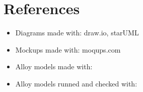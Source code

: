 \section{References}

\begin{itemize}
    \item Diagrams made with: draw.io, starUML
    \item Mockups made with: moqups.com
    \item Alloy models made with:
    \item Alloy models runned and checked with:
\end{itemize}
